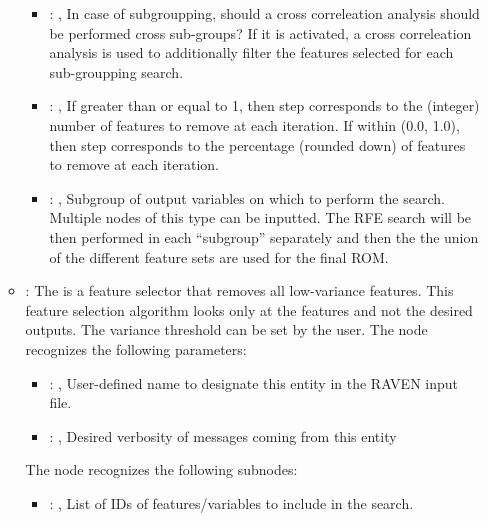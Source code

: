 \begin{itemize}
\begin{itemize}
\begin{itemize}
            \item {}: , 
              In case of subgroupping, should a cross correleation analysis should be performed
              cross sub-groups?         If it is activated, a cross correleation analysis is used to
              additionally filter the features selected for each         sub-groupping search.

            \item {}: , 
              If greater than or equal to 1, then step corresponds to the (integer) number
              of features to remove at each iteration. If within (0.0, 1.0), then step
              corresponds to the percentage (rounded down) of features to remove at         each
              iteration.

            \item {}: , 
              Subgroup of output variables on which to perform the search. Multiple nodes of this
              type can be inputted. The RFE search will be then performed in each ``subgroup''
              separately and then the the union of the different feature sets are used for the final
              ROM.
          \end{itemize}

        \item {}:
          The  is a feature selector that removes     all low-variance
          features. This feature selection algorithm looks only at the features and not     the
          desired outputs. The variance threshold can be set by the user.
          The  node recognizes the following parameters:
            \begin{itemize}
              \item {}: , 
                User-defined name to designate this entity in the RAVEN input file.
              \item {}: , 
                Desired verbosity of messages coming from this entity
          \end{itemize}

          The  node recognizes the following subnodes:
          \begin{itemize}
            \item {}: , 
              List of IDs of features/variables to include in the search.


\end{itemize}
\end{itemize}
\end{itemize}
